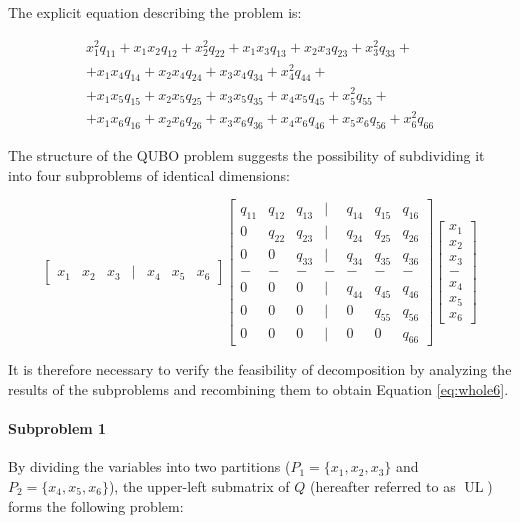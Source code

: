 The explicit equation describing the problem is:

\begin{multline}
    x_1^2q_{11} + x_1x_2q_{12} + x_2^2q_{22} + x_1x_3q_{13} + x_2x_3q_{23} + x_3^2q_{33} + \\ 
    + x_1x_4q_{14} + x_2x_4q_{24} + x_3x_4q_{34} + x_4^2q_{44} + \\ 
    + x_1x_5q_{15} + x_2x_5q_{25} + x_3x_5q_{35} + x_4x_5q_{45} + x_5^2q_{55} + \\ 
    + x_1x_6q_{16} + x_2x_6q_{26} + x_3x_6q_{36} + x_4x_6q_{46} + x_5x_6q_{56} + x_6^2q_{66}
    \label{eq:whole6}
\end{multline}

The structure of the QUBO problem suggests the possibility of subdividing it into four subproblems of identical dimensions:

\begin{equation}
    \begin{bmatrix}
        x_1 & x_2 & x_3 & | & x_4 & x_5 & x_6
    \end{bmatrix}
    \begin{bmatrix}
        q_{11} & q_{12} & q_{13} & | & q_{14} & q_{15} & q_{16} \\
        0 & q_{22} & q_{23} & | & q_{24} & q_{25} & q_{26} \\
        0 & 0 & q_{33} & | & q_{34} & q_{35} & q_{36} \\
        - & - & - & - & - & -  & - \\
        0 & 0 & 0 & | & q_{44} & q_{45} & q_{46} \\
        0 & 0 & 0 & | & 0 & q_{55} & q_{56} \\
        0 & 0 & 0 & | & 0 & 0 & q_{66}
    \end{bmatrix}
    \begin{bmatrix}
        x_1 \\
        x_2 \\
        x_3 \\
        - \\
        x_4 \\
        x_5 \\
        x_6
    \end{bmatrix}
\end{equation}

It is therefore necessary to verify the feasibility of decomposition by analyzing the results of the subproblems and recombining them to obtain Equation \ref{eq:whole6}.

\paragraph{Subproblem 1}
By dividing the variables into two partitions ($P_1=\{x_1,x_2,x_3\}$ and $P_2=\{x_4,x_5,x_6\}$), the upper-left submatrix of $Q$ (hereafter referred to as $\operatorname{UL}$) forms the following problem:

